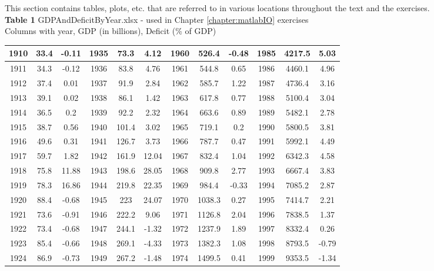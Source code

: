 This section contains tables, plots, etc. that are referred to in various locations throughout the text and the exercises.\\

{\bf Table 1}\label{table:GDPDeficit} GDPAndDeficitByYear.xlsx - used in Chapter \ref{chapter:matlabIO} exercises\\

Columns with year, GDP (in billions), Deficit (\% of GDP)\\

\hspace{-.6in}
\begin{tabular}{|c|c|c||c|c|c||c|c|c||c|c|c|}
\hline
1910&	33.4&	-0.11&	1935&	73.3&	4.12&	1960&	526.4&	-0.48&	1985&	4217.5&	5.03\\ \hline
1911&	34.3&	-0.12&	1936&	83.8&	4.76&	1961&	544.8&	0.65&	1986&	4460.1&	4.96\\ \hline
1912&	37.4&	0.01&	1937&	91.9&	2.84&	1962&	585.7&	1.22&	1987&	4736.4&	3.16\\ \hline
1913&	39.1&	0.02&	1938&	86.1&	1.42&	1963&	617.8&	0.77&	1988&	5100.4&	3.04\\ \hline
1914&	36.5&	0.2&	1939&	92.2&	2.32&	1964&	663.6&	0.89&	1989&	5482.1&	2.78\\ \hline
1915&	38.7&	0.56&	1940&	101.4&	3.02&	1965&	719.1&	0.2&	1990&	5800.5&	3.81\\ \hline
1916&	49.6&	0.31&	1941&	126.7	&3.73&	1966&	787.7&	0.47&	1991&	5992.1&	4.49\\ \hline
1917&	59.7&	1.82&	1942&	161.9&	12.04&	1967&	832.4&	1.04&	1992&	6342.3&	4.58\\ \hline
1918&	75.8&	11.88&	1943&	198.6&	28.05&	1968&	909.8&	2.77&	1993&	6667.4&	3.83\\ \hline
1919&	78.3&	16.86&	1944&	219.8&	22.35&	1969&	984.4&	-0.33&	1994&	7085.2&	2.87\\ \hline
1920&	88.4&	-0.68&	1945&	223&	24.07&	1970&	1038.3&	0.27&	1995&	7414.7&	2.21\\ \hline
1921&	73.6&	-0.91&	1946&	222.2&	9.06&	1971&	1126.8&	2.04&	1996&	7838.5&	1.37\\ \hline
1922&	73.4&	-0.68&	1947& 244.1&	-1.32&	1972&	1237.9&	1.89&	1997&	8332.4&	0.26\\ \hline
1923&	85.4&	-0.66&	1948&	269.1&	-4.33&	1973&	1382.3&	1.08&	1998&	8793.5&	-0.79\\ \hline
1924&	86.9&	-0.73&	1949&	267.2&	-1.48&	1974&	1499.5&	0.41&	1999&	9353.5&	-1.34\\ \hline

\end{tabular}
